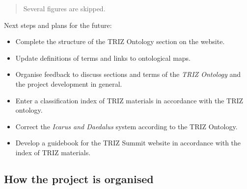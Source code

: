 \documentclass[11pt,a4paper]{article}
\begin{document}
\begin{quote}
  Several figures are skipped.
\end{quote}
Next steps and plans for the future: 
\begin{itemize}[noitemsep]
\item Complete the structure of the TRIZ Ontology section on the website.
\item Update definitions of terms and links to ontological maps.
\item Organise feedback to discuss sections and terms of the \emph{TRIZ
  Ontology} and the project development in general.
\item Enter a classification index of TRIZ materials in accordance with the
  TRIZ ontology.
\item Correct the \emph{Icarus and Daedalus} system according to the TRIZ
  Ontology.
\item Develop a guidebook for the TRIZ Summit website in accordance with the
  index of TRIZ materials.
\end{itemize}

\subsection{How the project is organised}
\end{document}
